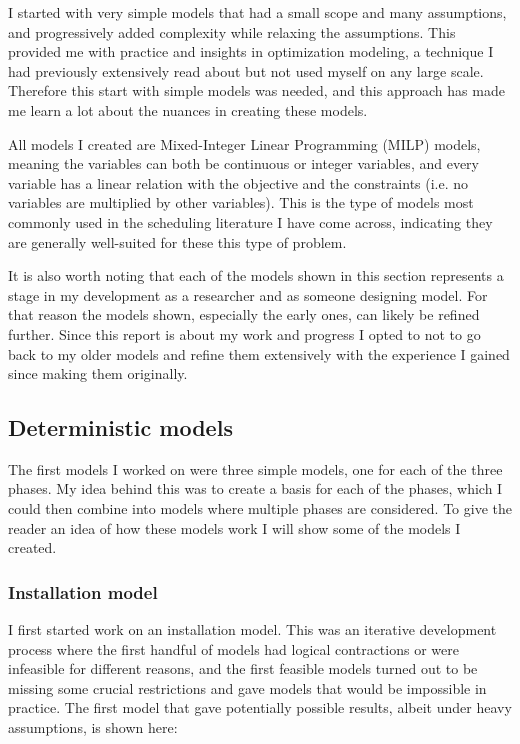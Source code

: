 \documentclass[a4paper,12pt]{article}
\begin{document}
I started with very simple models that had a small scope and many assumptions, and progressively added complexity while relaxing the assumptions. This provided me with practice and insights in optimization modeling, a technique I had previously extensively read about but not used myself on any large scale. Therefore this start with simple models was needed, and this approach has made me learn a lot about the nuances in creating these models. 

All models I created are Mixed-Integer Linear Programming (MILP) models, meaning the variables can both be continuous or integer variables, and every variable has a linear relation with the objective and the constraints (i.e. no variables are multiplied by other variables). This is the type of models most commonly used in the scheduling literature I have come across, indicating they are generally well-suited for these this type of problem. 

It is also worth noting that each of the models shown in this section represents a stage in my development as a researcher and as someone designing model. For that reason the models shown, especially the early ones, can likely be refined further. Since this report is about my work and progress I opted to not to go back to my older models and refine them extensively with the experience I gained since making them originally. 

\subsection{Deterministic models}
The first models I worked on were three simple models, one for each of the three phases. My idea behind this was to create a basis for each of the phases, which I could then combine into models where multiple phases are considered. To give the reader an idea of how these models work I will show some of the models I created.

\subsubsection{Installation model}
I first started work on an installation model. This was an iterative development process where the first handful of models had logical contractions or were infeasible for different reasons, and the first feasible models turned out to be missing some crucial restrictions and gave models that would be impossible in practice. The first model that gave potentially possible results, albeit under heavy assumptions, is shown here:
\end{document}

